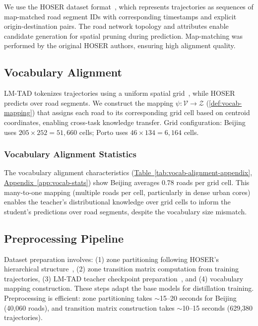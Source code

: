 We use the HOSER dataset format~\cite{caoHolisticSemanticRepresentation2025}, which represents trajectories as sequences of map-matched road segment IDs with corresponding timestamps and explicit origin-destination pairs. The road network topology and attributes enable candidate generation for spatial pruning during prediction. Map-matching was performed by the original HOSER authors, ensuring high alignment quality.

\subsection{Vocabulary Alignment}
\label{sec:data-lmtad-compat}

LM-TAD tokenizes trajectories using a uniform spatial grid~\cite{mbuyaTrajectoryAnomalyDetection2024}, while HOSER predicts over road segments. We construct the mapping $\psi: \mathcal{V} \rightarrow \mathcal{Z}$ (\autoref{def:vocab-mapping}) that assigns each road to its corresponding grid cell based on centroid coordinates, enabling cross-task knowledge transfer. Grid configuration: Beijing uses $205 \times 252 = 51{,}660$ cells; Porto uses $46 \times 134 = 6{,}164$ cells.

\subsubsection{Vocabulary Alignment Statistics}

The vocabulary alignment characteristics (\hyperref[app:vocab-stats]{Table~\ref*{tab:vocab-alignment-appendix}, Appendix~\ref*{app:vocab-stats}}) show Beijing averages 0.78 roads per grid cell. This many-to-one mapping (multiple roads per cell, particularly in dense urban cores) enables the teacher's distributional knowledge over grid cells to inform the student's predictions over road segments, despite the vocabulary size mismatch.

\subsection{Preprocessing Pipeline}
\label{sec:data-pipeline}

Dataset preparation involves: (1) zone partitioning following HOSER's hierarchical structure~\cite{caoHolisticSemanticRepresentation2025}, (2) zone transition matrix computation from training trajectories, (3) LM-TAD teacher checkpoint preparation~\cite{mbuyaTrajectoryAnomalyDetection2024}, and (4) vocabulary mapping construction. These steps adapt the base models for distillation training. Preprocessing is efficient: zone partitioning takes $\sim$15--20 seconds for Beijing (40,060 roads), and transition matrix construction takes $\sim$10--15 seconds (629,380 trajectories).

